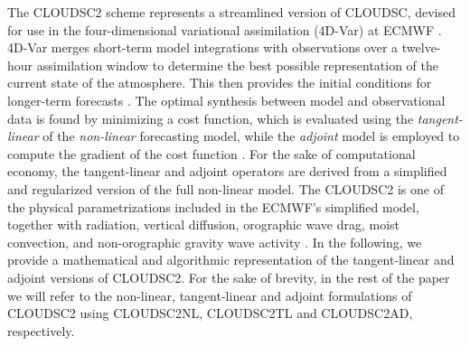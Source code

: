 \documentclass[../main.tex]{subfiles}
\begin{document}
        The CLOUDSC2 scheme represents a streamlined version of CLOUDSC, devised for use in the four-dimensional variational assimilation (4D-Var) at ECMWF \citep{courtier94}. 4D-Var merges short-term model integrations with observations over a twelve-hour assimilation window to determine the best possible representation of the current state of the atmosphere. This then provides the initial conditions for longer-term forecasts \citep{janiskova23}. The optimal synthesis between model and observational data is found by minimizing a cost function, which is evaluated using the \emph{tangent-linear} of the \emph{non-linear} forecasting model, while the \emph{adjoint} model is employed to compute the gradient of the cost function \citep{errico97, janiskova99}. For the sake of computational economy, the tangent-linear and adjoint operators are derived from a simplified and regularized version of the full non-linear model. The CLOUDSC2 is one of the physical parametrizations included in the ECMWF's simplified model, together with radiation, vertical diffusion, orographic wave drag, moist convection, and non-orographic gravity wave activity \citep{janiskova23}. In the following, we provide a mathematical and algorithmic representation of the tangent-linear and adjoint versions of CLOUDSC2. For the sake of brevity, in the rest of the paper we will refer to the non-linear, tangent-linear and adjoint formulations of CLOUDSC2 using CLOUDSC2NL, CLOUDSC2TL and CLOUDSC2AD, respectively.
\end{document}
